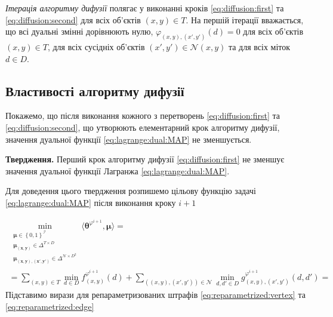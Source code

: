 \textit{Ітерація алгоритму дифузії}
полягає у виконанні кроків \eqref{eq:diffusion:first}
та \eqref{eq:diffusion:second} для всіх об'єктів $\left( x, y \right) \in T$.
На першій ітерації вважається, що всі дуальні змінні дорівнюють нулю,
$\varphi_{\left(x, y \right), \left(x', y' \right)} \left( d \right) = 0$
для всіх об'єктів $\left(x, y \right) \in T$,
для всіх сусідніх об'єктів
$\left(x', y' \right) \in \mathcal{N} \left(x, y \right)$
та для всіх міток $d \in D$.

\subsection{Властивості алгоритму дифузії}

Покажемо, що після виконання кожного з перетворень \eqref{eq:diffusion:first}
та \eqref{eq:diffusion:second},
що утворюють елементарний крок алгоритму дифузії,
значення дуальної функції \eqref{eq:lagrange:dual:MAP} не зменшується.

\textbf{Твердження.}
Перший крок алгоритму дифузії \eqref{eq:diffusion:first}
не зменшує значення дуальної функції Лагранжа \eqref{eq:lagrange:dual:MAP}.

Для доведення цього твердження розпишемо цільову функцію задачі
\eqref{eq:lagrange:dual:MAP} після виконання кроку $i + 1$

\begin{equation*}
\begin{gathered}
    \min \limits_{\substack{\pmb{\mu} \in \left\{ 0, 1 \right\}^{\mathcal{I}} \\
                            \pmb{\mu_{\left(x, y \right)}} \in \Delta^{T \times D} \\
                            \pmb{\mu_{\left(x, y \right), \left(x', y' \right)}} \in
                                \Delta^{\mathcal{N} \times D^2}}}
        \langle \pmb{\theta}^{\varphi^{i + 1}}, \pmb{\mu} \rangle = \\
    = \sum \limits_{\left(x, y \right) \in T}
        \min \limits_{d \in D}
            f_{\left(x, y \right)}^{\varphi^{i + 1}} \left( d \right) +
    \sum \limits_{\left( \left(x, y \right), \left(x', y' \right) \right) \in \mathcal{N}}
        \min \limits_{d, d' \in D}
            g_{\left(x, y \right), \left(x', y' \right)}^{\varphi^{i + 1}}
                \left( d, d' \right) =
\end{gathered}
\end{equation*}
Підставимо вирази для репараметризованих штрафів
\eqref{eq:reparametrized:vertex}
та \eqref{eq:reparametrized:edge}


